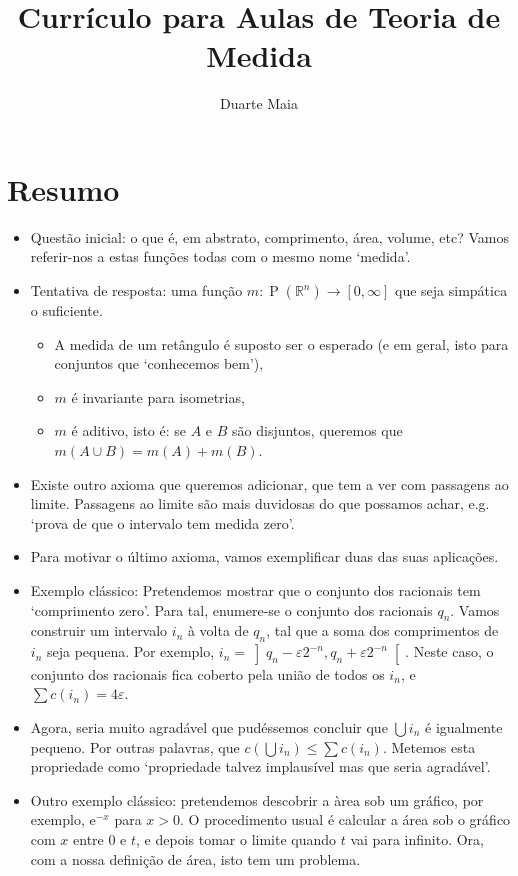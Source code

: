 \documentclass{article}
\title{Currículo para Aulas de Teoria de Medida}
\author{Duarte Maia}
\date{}
\newcommand{\R}{\mathbb{R}}
\newcommand{\e}{\mathrm{e}}
\DeclareMathOperator{\ps}{P}
\begin{document}
\maketitle

\section{Resumo}

\begin{itemize}
\item Questão inicial: o que é, em abstrato, comprimento, área, volume, etc? Vamos referir-nos a estas funções todas com o mesmo nome `medida'.
\item Tentativa de resposta: uma função $m : \ps(\R^n) \to \left[0, \infty\right]$ que seja simpática o suficiente.
\begin{itemize}
\item A medida de um retângulo é suposto ser o esperado (e em geral, isto para conjuntos que `conhecemos bem'),
\item $m$ é invariante para isometrias,
\item $m$ é aditivo, isto é: se $A$ e $B$ são disjuntos, queremos que $m(A \cup B) = m(A) + m(B)$.
\end{itemize}
\item Existe outro axioma que queremos adicionar, que tem a ver com passagens ao limite. Passagens ao limite são mais duvidosas do que possamos achar, e.g. `prova de que o intervalo tem medida zero'.
\item Para motivar o último axioma, vamos exemplificar duas das suas aplicações.
\item Exemplo clássico: Pretendemos mostrar que o conjunto dos racionais tem `comprimento zero'. Para tal, enumere-se o conjunto dos racionais $q_n$. Vamos construir um intervalo $i_n$ à volta de $q_n$, tal que a soma dos comprimentos de $i_n$ seja pequena. Por exemplo, $i_n = \left]q_n - \varepsilon 2^{-n}, q_n + \varepsilon 2^{-n}\right[$. Neste caso, o conjunto dos racionais fica coberto pela união de todos os $i_n$, e $\sum c(i_n) = 4 \varepsilon$.
\item Agora, seria muito agradável que pudéssemos concluir que $\bigcup i_n$ é igualmente pequeno. Por outras palavras, que $c(\bigcup i_n) \leq \sum c(i_n)$. Metemos esta propriedade como `propriedade talvez implausível mas que seria agradável'.
\item Outro exemplo clássico: pretendemos descobrir a àrea sob um gráfico, por exemplo, $\e^{-x}$ para $x>0$. O procedimento usual é calcular a área sob o gráfico com $x$ entre $0$ e $t$, e depois tomar o limite quando $t$ vai para infinito. Ora, com a nossa definição de área, isto tem um problema.

\end{itemize}
\end{document}
